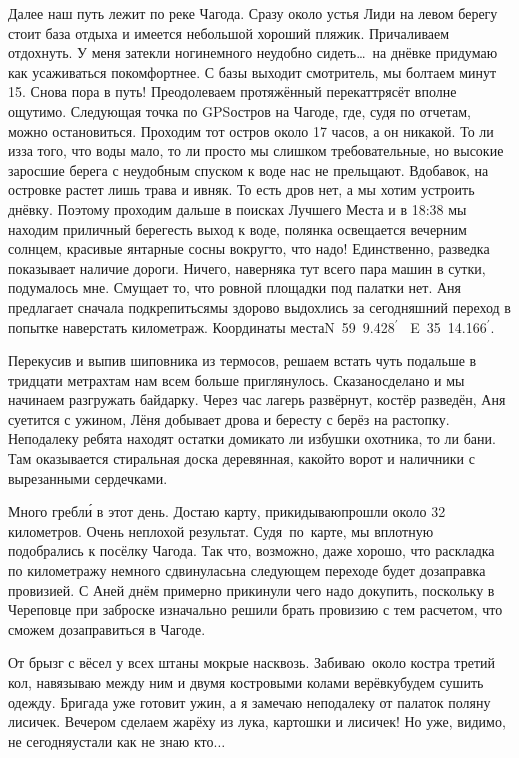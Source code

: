 Далее наш путь лежит по реке Чагода. Сразу около устья Лиди на левом берегу стоит база отдыха и имеется небольшой хороший пляжик. Причаливаем отдохнуть. У меня затекли ноги\mdash немного неудобно сидеть\ldots~на днёвке придумаю как усаживаться покомфортнее. С базы выходит смотритель, мы болтаем минут 15. Снова пора в путь! Преодолеваем протяжённый перекат\mdash трясёт вполне ощутимо. Следующая точка по GPS\mdash остров на Чагоде, где, судя по отчетам, можно остановиться. Проходим тот остров около 17 часов, а он никакой. То ли из\sdash за того, что воды мало, то ли просто мы слишком требовательные, но высокие заросшие берега с неудобным спуском к воде нас не прельщают. Вдобавок, на островке растет лишь трава и ивняк. То есть дров нет, а мы хотим устроить днёвку. Поэтому проходим дальше в поисках Лучшего Места и в 18:38 мы находим приличный берег\mdash есть выход к воде, полянка освещается вечерним солнцем, красивые янтарные сосны вокруг\mdash то, что надо! Единственно, разведка показывает наличие дороги. Ничего, наверняка тут всего пара машин в сутки, подумалось мне. Смущает то, что ровной площадки под палатки нет. Аня предлагает сначала подкрепиться\mdash мы здорово выдохлись за сегодняшний переход в попытке наверстать километраж. Координаты места\mdash N~59\degree~9.428$^\prime$~ E~35\degree~14.166$^\prime$.

Перекусив и выпив шиповника из термосов, решаем встать чуть подальше в тридцати метрах\mdash там нам всем больше приглянулось. Сказано\sdash сделано и мы начинаем разгружать байдарку. Через час лагерь развёрнут, костёр разведён, Аня суетится с ужином, Лёня добывает дрова и бересту с берёз на растопку. Неподалеку ребята находят остатки домика\mdash то ли избушки охотника, то ли бани. Там оказывается стиральная доска деревянная, какой\sdash то ворот и наличники с вырезанными сердечками. 

Много гребл\'{и} в этот день. Достаю карту, прикидываю\mdash прошли около 32 километров. Очень неплохой результат. Судя~по~карте, мы вплотную подобрались к посёлку Чагода. Так что, возможно, даже хорошо, что раскладка по километражу немного сдвинулась\mdash на следующем переходе будет дозаправка провизией. С Аней днём примерно прикинули чего надо докупить, поскольку в Череповце при заброске изначально решили брать провизию с тем расчетом, что сможем дозаправиться в Чагоде.

От брызг с вёсел у всех штаны мокрые насквозь. Забиваю~около костра третий кол, навязываю между ним и двумя костровыми колами верёвку\mdash будем сушить одежду. Бригада уже готовит ужин, а я замечаю неподалеку от палаток поляну лисичек. Вечером сделаем жарёху из лука, картошки и лисичек! Но уже, видимо, не сегодня\mdash устали как не знаю кто$\ldots$ 

